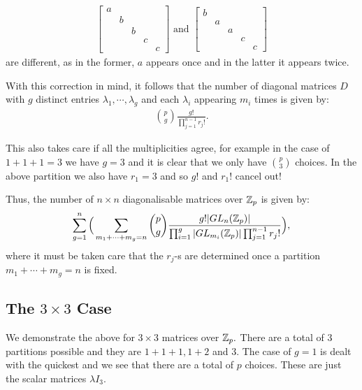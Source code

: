 \documentclass[11pt, titlepage, a4paper]{article}
\begin{document}
\begin{align*}
 \begin{bmatrix}
 a & & & & \\
  &b & & & \\
  & &b & & \\
  & & & c& \\
  & & & &c 
\end{bmatrix} \text{ and }  \begin{bmatrix}
 b & & & & \\
  &a & & & \\
  & &a & & \\
  & & & c& \\
  & & & &c 
\end{bmatrix}
\end{align*} are different, as in the former, $a$ appears once and in the latter it appears twice.

With this correction in mind, it follows that the number of diagonal matrices $D$ with $g$ distinct entries $\lambda_{1},\cdots,\lambda_{g}$ and each $\lambda_{i}$ appearing $m_{i}$ times is given by:
\begin{align*}
 \binom{p}{g} \frac{g!}{\prod_{j=1}^{n-1} r_{j}!}.
\end{align*}

This also takes care if all the multiplicities agree, for example in the case of $1+1+1=3$ we have $g=3$ and it is clear that we only have $\binom{p}{3}$ choices. In the above partition we also have $r_{1}=3$ and so $g!$ and $r_{1}!$ cancel out!

Thus, the number of $n\times n$ diagonalisable matrices over $\mathbb{Z}_{p}$ is given by:
\begin{align*}
 \sum_{g=1}^{n} \Big( \sum_{m_{1}+\cdots +m_{g}=n}  \binom{p}{g} \frac{g! |GL_{n}(\mathbb{Z}_{p})|}{\prod_{i=1}^{g} |GL_{m_{i}}(\mathbb{Z}_{p})| \prod_{j=1}^{n-1} r_{j}!} \Big),
\end{align*}
where it must be taken care that the $r_{j}$-s are determined once a partition $m_{1}+\cdots +m_{g}=n$ is fixed.

\subsection{The $3\times 3$ Case}

We demonstrate the above for $3\times 3$ matrices over $\mathbb{Z}_{p}.$ There are a total of $3$ partitions possible and they are $1+1+1, 1+2$ and $3.$ The case of $g=1$ is dealt with the quickest and we see that there are a total of $p$ choices. These are just the scalar matrices $\lambda I_{3}.$
\end{document}
